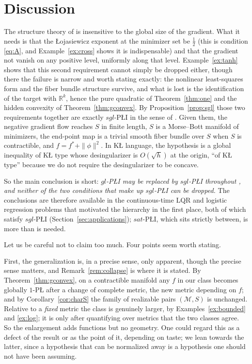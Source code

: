 \documentclass[11pt]{article}
\theoremstyle{plain}
\theoremstyle{definition}
\theoremstyle{remark}
\newcommand{\M}{\mathcal{M}}
\newcommand{\R}{\mathbb{R}}
\newcommand{\KL}{\textup{K\L}}
\begin{document}
\section{Discussion}
\label{sec:discussion}


The structure theory of \cite{BCR2026} is insensitive to the global size of the
gradient. What it needs is that the \L{}ojasiewicz exponent at the minimizer set
be $\tfrac12$ (this is condition \eqref{eq:A}, and Example~\ref{ex:cross}
shows it is indispensable) and that the gradient not vanish on any positive
level, uniformly along that level. Example~\ref{ex:tanh} shows that this second
requirement cannot simply be dropped either, though there the failure is narrow and
worth stating exactly: the nonlinear least-squares form and the fiber bundle
structure survive, and what is lost is the identification of the target with $\R^k$,
hence the pure quadratic of Theorem~\ref{thm:one} and the hidden convexity of
Theorem~\ref{thm:gconvex}. By Proposition~\ref{prop:sgl} those two requirements together are
exactly $sgl$-P\L{}I in the sense of \cite{Sontag2025L4DC}. Given them, the
negative gradient flow reaches $S$ in finite length, $S$ is a Morse--Bott
manifold of minimizers, the end-point map is a trivial smooth fiber bundle over
$S$ when $S$ is contractible, and $f = f^* + \|\phi\|^2$. In \KL{} language, the
hypothesis is a global inequality of \KL{} type whose desingularizer is
$O(\sqrt h)$ at the origin, ``of \KL{} type'' because we do not require the
desingularizer to be concave.

So the main conclusion is short: \emph{$gl$-P\L{}I may be replaced by $sgl$-P\L{}I
throughout \cite{BCR2026}, and neither of the two conditions that make up
$sgl$-P\L{}I can be dropped.} The conclusions are therefore available in the
continuous-time LQR and logistic regression problems that motivated the hierarchy
in the first place, both of which satisfy $sgl$-P\L{}I
(Section~\ref{sec:applications}); $sat$-P\L{}I, which sits strictly between, is
more than is needed.

Let us be careful not to claim too much. Four points seem worth stating.

First, the generalization is, in a precise sense, only apparent, though the
precise sense matters, and Remark~\ref{rem:collapse} is where it is stated. By
Theorem~\ref{thm:gconvex}, on a contractible manifold any $f$ in our class
becomes globally $1$-P\L{} after a change of complete metric, the new metric
depending on $f$; and by Corollary~\ref{cor:charS} the family of realizable
pairs $(\M,S)$ is unchanged. Relative to a \emph{fixed} metric the class is
genuinely larger, by Examples~\ref{ex:bounded} and \ref{ex:log}; it is only
after quantifying over metrics that the two classes agree. So the enlargement
adds functions but no geometry. One could regard
this as a defect of the result or as the point of it, depending on taste; we
lean towards the latter, since a hypothesis that can be normalized away is a
hypothesis one should not have been assuming.
\end{document}

